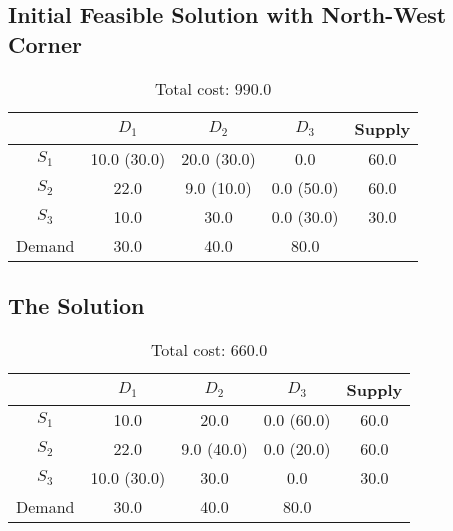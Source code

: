 \documentclass{article}
\begin{document}
\subsection{Initial Feasible Solution with North-West Corner}
\begin{table}[H]
\begin{tabular}{|c|c|c|c|c|}
\hline
     & $D_1$ & $D_2$ & $D_3$ & Supply \\
\hline
$S_1$ & 10.0 \tiny{(30.0)} & 20.0 \tiny{(30.0)} & 0.0 & 60.0\\
$S_2$ & 22.0 & 9.0 \tiny{(10.0)} & 0.0 \tiny{(50.0)} & 60.0\\
$S_3$ & 10.0 & 30.0 & 0.0 \tiny{(30.0)} & 30.0\\
\hline
Demand & 30.0 & 40.0 & 80.0 & \\
\hline
\end{tabular}
\label{tbl:}
\caption{Total cost: 990.0}
\end{table}


\subsection{The Solution}
\begin{table}[H]
\begin{tabular}{|c|c|c|c|c|}
\hline
     & $D_1$ & $D_2$ & $D_3$ & Supply \\
\hline
$S_1$ & 10.0 & 20.0 & 0.0 \tiny{(60.0)} & 60.0\\
$S_2$ & 22.0 & 9.0 \tiny{(40.0)} & 0.0 \tiny{(20.0)} & 60.0\\
$S_3$ & 10.0 \tiny{(30.0)} & 30.0 & 0.0 & 30.0\\
\hline
Demand & 30.0 & 40.0 & 80.0 & \\
\hline
\end{tabular}
\label{tbl:}
\caption{Total cost: 660.0}
\end{table}
\end{document}
